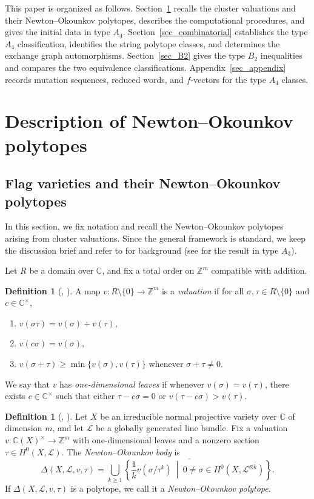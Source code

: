 \documentclass[10pt]{amsart}
\numberwithin{equation}{section}
\newcommand{\C}{{\mathbb{C}}}
\newcommand{\Z}{{\mathbb{Z}}}
\theoremstyle{plain}
\theoremstyle{definition}
\newtheorem{definition}[theorem]{Definition}
\theoremstyle{remark}
\begin{document}
This paper is organized as follows.
Section~\ref{section_NOBYs_flag5} recalls the cluster
valuations and their Newton--Okounkov polytopes,
describes the computational procedures, and gives the
initial data in type $A_4$.
Section~\ref{sec_combinatorial} establishes the type
$A_4$ classification, identifies the string polytope
classes, and determines the exchange graph automorphisms.
Section~\ref{sec_B2} gives the type $B_2$ inequalities
and compares the two equivalence classifications. 
Appendix~\ref{sec_appendix} records mutation sequences,
reduced words, and $f$-vectors for the type $A_4$ classes.


\section{Description of Newton--Okounkov polytopes}\label{section_NOBYs_flag5}
\subsection{Flag varieties and their Newton--Okounkov polytopes}

In this section, we fix notation and recall the Newton--Okounkov polytopes arising from cluster valuations.
Since the general framework is standard, we keep the discussion brief and refer to
\cite{KK12,LM09,Kav15,HaradaKaveh15,FujitaOya} for background (see \cite{CFHL} for the result in type $A_3$).

Let $R$ be a domain over $\C$, and fix a total order on $\Z^m$ compatible with addition.
\begin{definition}[{\cite[Definition~3.1]{HaradaKaveh15}, \cite[Definition~2.1]{FujitaOya}}]
	A map $v\colon R\setminus\{0\}\to \Z^m$ is a \emph{valuation} if for all $\sigma,\tau\in R\setminus\{0\}$ and $c\in \C^\times$,
	\begin{enumerate}
		\item $v(\sigma\tau)=v(\sigma)+v(\tau)$,
		\item $v(c\sigma)=v(\sigma)$,
		\item $v(\sigma+\tau)\ge \min\{v(\sigma),v(\tau)\}$ whenever $\sigma+\tau\neq 0$.
	\end{enumerate}
	We say that $v$ has \emph{one-dimensional leaves} if whenever $v(\sigma)=v(\tau)$, there exists $c\in \C^\times$ such that either
	$\tau-c\sigma=0$ or $v(\tau-c\sigma)>v(\tau)$.
\end{definition}

\begin{definition}[{\cite[\S1.2]{Kav15}, \cite[Definition~2.4]{FujitaOya}}]
	Let $X$ be an irreducible normal projective variety over $\C$ of dimension $m$, and let $\mathcal L$ be a globally generated line bundle.
	Fix a valuation $v\colon \C(X)^\times\to \Z^m$ with one-dimensional leaves and a nonzero section $\tau\in H^0(X,\mathcal L)$.
	The \emph{Newton--Okounkov body} is
	\[
	\Delta(X,\mathcal L,v,\tau)
	=\overline{\bigcup_{k\ge 1}\left\{\frac{1}{k}v(\sigma/\tau^k)\ \middle|\ 0\neq \sigma\in H^0(X,\mathcal L^{\otimes k})\right\}}.
	\]
	If $\Delta(X,\mathcal L,v,\tau)$ is a polytope, we call it a \emph{Newton--Okounkov polytope}.
\end{definition}
\end{document}
